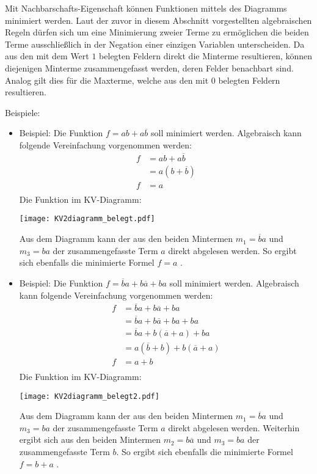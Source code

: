 Mit Nachbarschafts-Eigenschaft können Funktionen mittels des Diagramms minimiert werden. Laut der zuvor in diesem Abschnitt vorgestellten algebraischen Regeln dürfen sich um eine Minimierung zweier Terme zu ermöglichen die beiden Terme ausschließlich in der Negation einer einzigen Variablen unterscheiden. Da aus den mit dem Wert $1$ belegten Feldern direkt die Minterme resultieren, können diejenigen Minterme zusammengefasst werden, deren Felder benachbart sind. Analog gilt dies für die Maxterme, welche aus den mit $0$ belegten Feldern resultieren. 

Beispiele:
\begin{itemize}
	\item
		Beispiel: Die Funktion $f = ab + a\overline{b}$ soll minimiert werden. Algebraisch kann folgende Vereinfachung vorgenommen werden:
		\begin{align*}
			f &= ab + a\overline{b}  \\
			  &= a(b + \overline{b}) \\
			f &= a                   \\
		\end{align*}
		Die Funktion im KV-Diagramm:
		\begin{center}
			{\texttt{[image: KV2diagramm\_belegt.pdf]}}
		\end{center}
		Aus dem Diagramm kann der aus den beiden Mintermen $m_1 = \overline{b}a$ und $m_3 = ba$ der zusammengefasste Term $a$ direkt abgelesen werden. So ergibt sich ebenfalls die minimierte Formel $f = a$ .
	\item
		Beispiel: Die Funktion $f = \overline{b}a + b\overline{a} + ba$ soll minimiert werden. Algebraisch kann folgende Vereinfachung vorgenommen werden:
		\begin{align*}
			f &= \overline{b}a + b\overline{a} + ba  \\
			  &= \overline{b}a + b\overline{a} + ba + ba \\
			  &= \overline{b}a + b(\overline{a} + a) + ba \\
			  &= a(\overline{b} + b) + b(\overline{a} + a) \\
			f &= a + b \\
		\end{align*}
		Die Funktion im KV-Diagramm:
		\begin{center}
			{\texttt{[image: KV2diagramm\_belegt2.pdf]}}
		\end{center}
		Aus dem Diagramm kann der aus den beiden Mintermen $m_1 = \overline{b}{a}$ und $m_3 = ba$ der zusammengefasste Term $a$ direkt abgelesen werden. Weiterhin ergibt sich aus den beiden Mintermen $m_2 = {b}\overline{a}$ und $m_3 = ba$ der zusammengefasste Term $b$. So ergibt sich ebenfalls die minimierte Formel $f = b + a$ .
\end{itemize}

